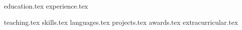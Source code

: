 \documentclass[letterpaper,11pt]{article}
\begin{document}
 
{education.tex}
{experience.tex}

\pagebreak

{teaching.tex}
\sidebyside
    {{skills.tex}}
    {{languages.tex}}
{projects.tex}
{awards.tex}
{extracurricular.tex}
\end{document}
